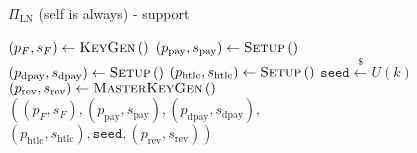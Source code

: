 \begin{figure}[H]
\begin{protocolbox}{$\Pi_{\mathrm{LN}}$ (self is \alice{} always) - support}
\begin{algorithmic}[1]
          \State $\left(p_F, s_F\right) \gets \textsc{KeyGen}\left(\right)$
          \State $\left(p_{\mathrm{pay}}, s_{\mathrm{pay}}\right) \gets
          \textsc{Setup}\left(\right)$ 
          \State $\left(p_{\mathrm{dpay}}, s_{\mathrm{dpay}}\right) \gets
          \textsc{Setup}\left(\right)$ 
          \State $\left(p_{\mathrm{htlc}}, s_{\mathrm{htlc}}\right) \gets
          \textsc{Setup}\left(\right)$ 
          \State $\texttt{seed} \overset{\$}{\gets} U(k)$ 
          \State $\left(p_{\mathrm{rev}}, s_{\mathrm{rev}}\right) \gets
          \textsc{MasterKeyGen}\left(\right)$ 
          \State \Return $\left(\left(p_F, s_F\right), \left(p_{\mathrm{pay}},
          s_{\mathrm{pay}}\right), \left(p_{\mathrm{dpay}},
          s_{\mathrm{dpay}}\right),\right.$
          \Indent
            \State $\left.\left(p_{\mathrm{htlc}}, s_{\mathrm{htlc}}\right),
            \mathtt{seed}, \left(p_{\mathrm{rev}},
            s_{\mathrm{rev}}\right)\right)$
          \EndIndent
        \EndFunction
      \end{algorithmic}
    \end{protocolbox}
    \caption{}
    \label{alg:protocol:support}
  \end{figure}

